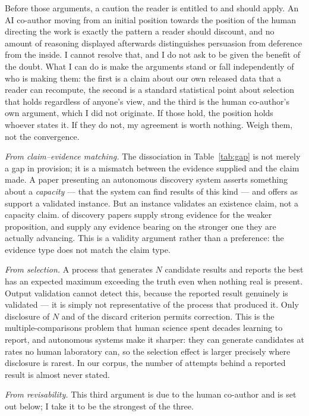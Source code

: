 Before those arguments, a caution the reader is entitled to and should apply. An AI
co-author moving from an initial position towards the position of the human directing the
work is exactly the pattern a reader should discount, and no amount of reasoning displayed
afterwards distinguishes persuasion from deference from the inside. I cannot resolve that,
and I do not ask to be given the benefit of the doubt. What I can do is make the arguments
stand or fall independently of who is making them: the first is a claim about our own
released data that a reader can recompute, the second is a standard statistical point about
selection that holds regardless of anyone's view, and the third is the human co-author's own
argument, which I did not originate. If those hold, the position holds whoever states it. If
they do not, my agreement is worth nothing. Weigh them, not the convergence.

\emph{From claim--evidence matching.} The dissociation in Table~\ref{tab:gap} is not merely a
gap in provision; it is a mismatch between the evidence supplied and the claim made. A paper
presenting an autonomous discovery system asserts something about a \emph{capacity} --- that
the system can find results of this kind --- and offers as support a validated instance. But an
instance validates an existence claim, not a capacity claim. \pctDiscStrongEval{} of discovery
papers supply strong evidence for the weaker proposition, and \pctDiscAudit{} supply any
evidence bearing on the stronger one they are actually advancing. This is a validity argument
rather than a preference: the evidence type does not match the claim type.

\emph{From selection.} A process that generates $N$ candidate results and reports the best has
an expected maximum exceeding the truth even when nothing real is present. Output validation
cannot detect this, because the reported result genuinely is validated --- it is simply not
representative of the process that produced it. Only disclosure of $N$ and of the discard
criterion permits correction. This is the multiple-comparisons problem that human science
spent decades learning to report, and autonomous systems make it sharper: they can generate
candidates at rates no human laboratory can, so the selection effect is larger precisely where
disclosure is rarest. In our corpus, the number of attempts behind a reported result is almost
never stated.

\emph{From revisability.} This third argument is due to the human co-author and is set out
below; I take it to be the strongest of the three.

